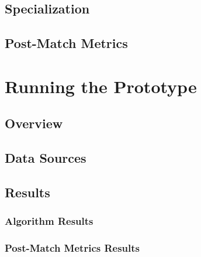 \documentclass{article}
\begin{document}


\subsection{Specialization}




%

\subsection{Post-Match Metrics}\label{post-match}



\section{Running the Prototype}

\subsection{Overview}



\subsection{Data Sources}



\subsection{Results}

\subsubsection{Algorithm Results}



\subsubsection{Post-Match Metrics Results}
\end{document}
